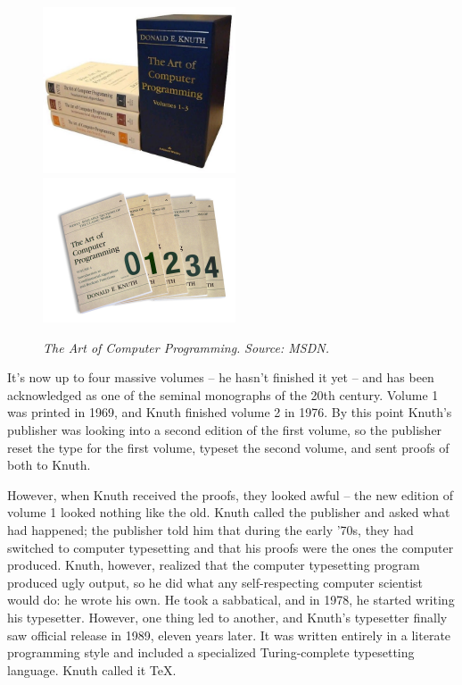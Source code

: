 \documentclass[ignorenonframetext]{beamer}
\newcommand{\abbr}[1]{#1}
\begin{document}
\begin{frame}
  \begin{figure}
    \centering
    \includegraphics[width=2.25in]{images/aocp.jpg}
    \includegraphics[width=2.25in]{images/aocp-vol2.jpg}
    \caption{\emph{The Art of Computer Programming.} \emph{Source: \abbr{MSDN}.}}
    \label{fig:aocp}
  \end{figure}
\end{frame}

It's now up to four massive volumes -- he hasn't finished it yet --
and has been acknowledged as one of the seminal monographs of the 20th
century.  Volume 1 was printed in 1969, and Knuth finished volume 2 in
1976.  By this point Knuth's publisher was looking into a second
edition of the first volume, so the publisher reset the type for the
first volume, typeset the second volume, and sent proofs of both to
Knuth.

However, when Knuth received the proofs, they looked awful -- the new
edition of volume 1 looked nothing like the old.  Knuth called the
publisher and asked what had happened; the publisher told him that
during the early '70s, they had switched to computer typesetting and
that his proofs were the ones the computer produced.  Knuth, however,
realized that the computer typesetting program produced ugly output,
so he did what any self-respecting computer scientist would do: he
wrote his own.  He took a sabbatical, and in 1978, he started writing
his typesetter.  However, one thing led to another, and Knuth's
typesetter finally saw official release in 1989, eleven years later.
It was written entirely in a literate programming style and included a
specialized Turing-complete typesetting language.  Knuth called it
\TeX.
\end{document}
